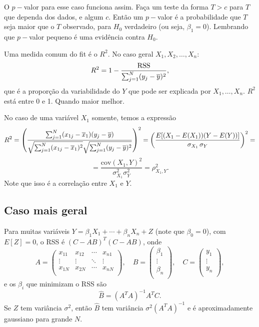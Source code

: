 \documentclass[a4paper,fleqn,12pt]{article}
\begin{document}
O $p-$valor para esse caso funciona assim. Faça um teste da forma $T > c$ para $T$ que dependa dos dados, e algum $c$. Então um $p-$valor é a probabilidade que $T$ seja maior que o $T$ observado, para $H_0$ verdadeiro (ou seja, $\beta_1 = 0$). Lembrando que $p-$valor pequeno é uma evidência contra $H_0$.

Uma medida comum do fit é o $R^2$. No caso geral $X_1, X_2, \ldots, X_n$:
$$
R^2 = 1 - \frac{\text{RSS}}{\sum_{j=1}^N (y_j - \overline{y})^2},
$$
que é a proporção da variabilidade do $Y$ que pode ser explicada por $X_1, \ldots, X_n$. $R^2$ está entre 0 e 1. Quando maior melhor.

No caso de uma variável $X_1$ somente, temos a expressão
$$
R^2 = \qty(\frac{\sum_{j=1}^N (x_{1j}-\overline{x}_1)(y_j-\overline{y})}
{\sqrt{\sum_{j=1}^N (x_{1j}-\overline{x}_1)^2}\sqrt{\sum_{j=1}^N (y_j-\overline{y})^2}})^2 =
\qty(\frac{E[(X_1-E(X_1))(Y-E(Y))]}{\sigma_{X_1} \, \sigma_Y})^2 =
$$
$$
= \frac{\text{cov}(X_1, Y)^2}{\sigma_{X_1}^2 \sigma_Y^2} =
\rho_{X_1, Y}^2.
$$
Note que isso é a correlação entre $X_1$ e $Y$.

\subsection{Caso mais geral}

Para muitas variáveis $Y = \beta_1 X_1 + \cdots + \beta_n X_n + Z$ (note que $\beta_0 = 0$), com $E[Z] = 0$, o RSS é $(C-AB)^T (C-AB)$, onde
$$
A =
\begin{pmatrix}
x_{11} & x_{12} & \cdots & x_{n1} \\
\vdots & \vdots & \ddots & \vdots \\
x_{1N} & x_{2N} & \cdots & x_{nN} \\
\end{pmatrix}, \quad
B =
\begin{pmatrix}
\beta_1 \\
\vdots \\
\beta_n \\
\end{pmatrix}, \quad
C =
\begin{pmatrix}
y_1 \\
\vdots \\
y_n \\
\end{pmatrix},
$$
e os $\beta_i$ que minimizam o RSS são
$$
\hat{B} = (A^T A)^{-1} A^T C.
$$
Se $Z$ tem variância $\sigma^2$, então $\hat{B}$ tem variância $\sigma^2 (A^T A)^{-1}$ e é aproximadamente gaussiano para grande $N$.
\end{document}
